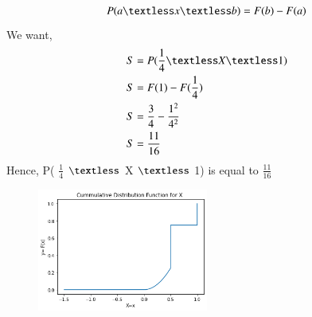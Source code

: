 \begin{align}
 P ( a \textless x \textless b ) =  F(b) - F(a) \end{align}
We want, 
 \begin{align}
S&= P ( {\dfrac{1}{4}}  \textless  X \textless  1)\\
S&= F(1) - F(\dfrac{1}{4})  \\
S&= \dfrac{3}{4} - \dfrac{1^2}{4^2} \\
S&= \dfrac{11}{16}
\end{align}
Hence, P( ${\frac{1}{4}}$ $ \textless $ X $\textless $ 1) is equal to $\frac{11}{16}$

\begin{figure}[!ht]
\centering
\includegraphics[width=0.5\textwidth]{solutions/ec/54/codes/graph.png}
\label{ec54:fig:graph.png}
\end{figure}


